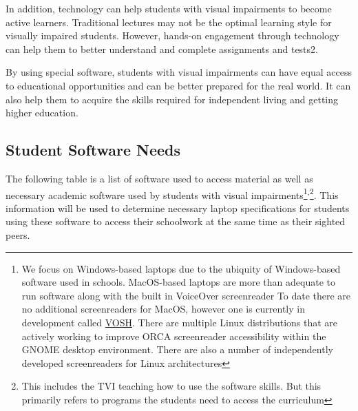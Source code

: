 \documentclass[14pt,letterpaper,twoside]{extreport}
\newcommand\fnsep{\textsuperscript{,}}
\begin{document}
In addition, technology can help students with visual impairments to become active learners. Traditional lectures may not be the optimal learning style for visually impaired students. However, hands-on engagement through technology can help them to better understand and complete assignments and tests2.

By using special software, students with visual impairments can have equal access to educational opportunities and can be better prepared for the real world. It can also help them to acquire the skills required for independent living and getting higher education.

\pagebreak\hypertarget{student-software-needs}{}\subsection{Student Software Needs}\label{student-software-needs}
The following table is a list of software used to access material as well as necessary academic software used by students with visual impairments\footnote{We focus on Windows-based laptops due to the ubiquity of Windows-based software used in schools. MacOS-based laptops are more than adequate to run software along with the built in VoiceOver screenreader  To date there are no additional screenreaders for MacOS, however one is currently in development called \href{https://youtu.be/qTkS-zNzF88?si=3XTXtbyOWD9kvwlk}{VOSH}. There are multiple Linux distributions that are actively working to improve ORCA screenreader accessibility within the GNOME desktop environment. There are also a number of independently developed screenreaders for Linux architectures}\fnsep\footnote{This includes the TVI teaching how to use the software skills. But this primarily refers to programs the students need to access the curriculum}. This information will be used to determine necessary laptop specifications for students using these software to access their schoolwork at the same time as their sighted peers. 
\end{document}
